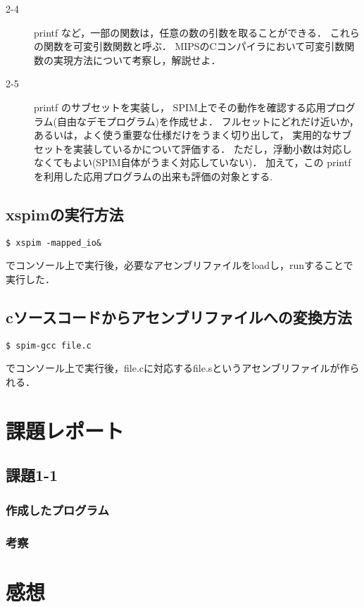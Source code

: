 \documentclass[a4j,11pt]{jarticle}
\begin{document}
\begin{description}
\item[2-4]
printf など，一部の関数は，任意の数の引数を取ることができる． これらの関数を可変引数関数と呼ぶ． MIPSのCコンパイラにおいて可変引数関数の実現方法について考察し，解説せよ．

\item[2-5]printf のサブセットを実装し， SPIM上でその動作を確認する応用プログラム(自由なデモプログラム)を作成せよ． フルセットにどれだけ近いか，あるいは，よく使う重要な仕様だけをうまく切り出して， 実用的なサブセットを実装しているかについて評価する． ただし，浮動小数は対応しなくてもよい(SPIM自体がうまく対応していない)． 加えて，この printf を利用した応用プログラムの出来も評価の対象とする.

\end{description}
\subsection{xspimの実行方法}
\begin{verbatim}
$ xspim -mapped_io&
\end{verbatim}
でコンソール上で実行後，必要なアセンブリファイルをloadし，runすることで実行した．

\subsection{cソースコードからアセンブリファイルへの変換方法} 
\begin{verbatim}
$ spim-gcc file.c
\end{verbatim}
でコンソール上で実行後，file.cに対応するfile.sというアセンブリファイルが作られる．
\section{課題レポート}

 \subsection{課題1-1}

  \subsubsection{作成したプログラム}

  \subsubsection{考察}

\section{感想}
\end{document}
